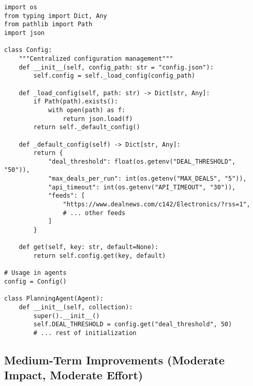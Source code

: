 \begin{lstlisting}[caption=Configuration Management Enhancement]
import os
from typing import Dict, Any
from pathlib import Path
import json

class Config:
    """Centralized configuration management"""
    def __init__(self, config_path: str = "config.json"):
        self.config = self._load_config(config_path)
    
    def _load_config(self, path: str) -> Dict[str, Any]:
        if Path(path).exists():
            with open(path) as f:
                return json.load(f)
        return self._default_config()
    
    def _default_config(self) -> Dict[str, Any]:
        return {
            "deal_threshold": float(os.getenv("DEAL_THRESHOLD", "50")),
            "max_deals_per_run": int(os.getenv("MAX_DEALS", "5")),
            "api_timeout": int(os.getenv("API_TIMEOUT", "30")),
            "feeds": [
                "https://www.dealnews.com/c142/Electronics/?rss=1",
                # ... other feeds
            ]
        }
    
    def get(self, key: str, default=None):
        return self.config.get(key, default)

# Usage in agents
config = Config()

class PlanningAgent(Agent):
    def __init__(self, collection):
        super().__init__()
        self.DEAL_THRESHOLD = config.get("deal_threshold", 50)
        # ... rest of initialization
\end{lstlisting}

\subsection{Medium-Term Improvements (Moderate Impact, Moderate Effort)}

